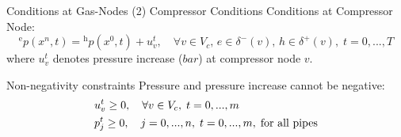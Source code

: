 \documentclass[8pt]{beamer}
\begin{document}
\begin{frame}{Conditions at Gas-Nodes (2)}
\textcolor{bluepurp}{Compressor Conditions} \newline\newline
Conditions at Compressor Node:
\begin{equation}
{}^\text{e}p(x^n,t) = {}^\text{h}p(x^0,t) +  u_v^t, \quad \forall v \in V_c,  \, e \in \delta^-(v),  \, h \in \delta^+(v), \; t = 0,...,T
\end{equation}
where $u_v^t$ denotes pressure increase ($bar$) at compressor node $v$.  \newline

\textcolor{bluepurp}{Non-negativity constraints} \newline\newline
Pressure and pressure increase cannot be negative:
\begin{alignat}{1}
&u_{v}^t \geq 0, \quad \forall v \in V_c, \;  t = 0,...,m\\
&p_{j}^t \geq 0, \quad j=0,...,n,  \;  t=0,...,m, \; \textnormal{for all pipes}
\end{alignat}
\end{frame}
\end{document}
